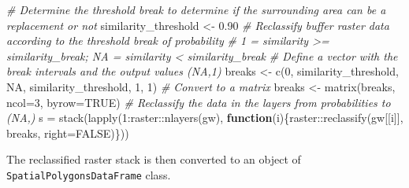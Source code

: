 \documentclass[
  10pt,
  b5paper,
  oneside]{book}
\newenvironment{Shaded}{\begin{snugshade}}{\end{snugshade}}
\newcommand{\AttributeTok}[1]{\textcolor[rgb]{0.77,0.63,0.00}{#1}}
\newcommand{\CommentTok}[1]{\textcolor[rgb]{0.56,0.35,0.01}{\textit{#1}}}
\newcommand{\ConstantTok}[1]{\textcolor[rgb]{0.00,0.00,0.00}{#1}}
\newcommand{\ControlFlowTok}[1]{\textcolor[rgb]{0.13,0.29,0.53}{\textbf{#1}}}
\newcommand{\DecValTok}[1]{\textcolor[rgb]{0.00,0.00,0.81}{#1}}
\newcommand{\DocumentationTok}[1]{\textcolor[rgb]{0.56,0.35,0.01}{\textbf{\textit{#1}}}}
\newcommand{\FloatTok}[1]{\textcolor[rgb]{0.00,0.00,0.81}{#1}}
\newcommand{\FunctionTok}[1]{\textcolor[rgb]{0.00,0.00,0.00}{#1}}
\newcommand{\NormalTok}[1]{#1}
\newcommand{\OtherTok}[1]{\textcolor[rgb]{0.56,0.35,0.01}{#1}}
\newcommand{\SpecialCharTok}[1]{\textcolor[rgb]{0.00,0.00,0.00}{#1}}
\newcommand{\StringTok}[1]{\textcolor[rgb]{0.31,0.60,0.02}{#1}}
\begin{document}
\begin{Shaded}
\begin{Highlighting}[]
  \CommentTok{\# Determine the threshold break to determine if the surrounding area can be a replacement or not}
\NormalTok{    similarity\_threshold }\OtherTok{\textless{}{-}} \FloatTok{0.90}
  \CommentTok{\# Reclassify buffer raster data according to the threshold break of probability}
  \CommentTok{\# 1 = similarity \textgreater{}= similarity\_break; NA =  similarity \textless{}  similarity\_break}
    \CommentTok{\# Define a vector with the break intervals and the output values (NA,1) }
\NormalTok{    breaks }\OtherTok{\textless{}{-}} \FunctionTok{c}\NormalTok{(}\DecValTok{0}\NormalTok{, similarity\_threshold, }\ConstantTok{NA}\NormalTok{, similarity\_threshold, }\DecValTok{1}\NormalTok{, }\DecValTok{1}\NormalTok{)}
    \CommentTok{\# Convert to a matrix}
\NormalTok{    breaks }\OtherTok{\textless{}{-}} \FunctionTok{matrix}\NormalTok{(breaks, }\AttributeTok{ncol=}\DecValTok{3}\NormalTok{, }\AttributeTok{byrow=}\ConstantTok{TRUE}\NormalTok{)}
    \CommentTok{\# Reclassify the data in the layers from probabilities to (NA,)}
\NormalTok{    s }\OtherTok{=} \FunctionTok{stack}\NormalTok{(}\FunctionTok{lapply}\NormalTok{(}\DecValTok{1}\SpecialCharTok{:}\NormalTok{raster}\SpecialCharTok{::}\FunctionTok{nlayers}\NormalTok{(gw), }\ControlFlowTok{function}\NormalTok{(i)\{raster}\SpecialCharTok{::}\FunctionTok{reclassify}\NormalTok{(gw[[i]], breaks, }\AttributeTok{right=}\ConstantTok{FALSE}\NormalTok{)\}))}
\end{Highlighting}
\end{Shaded}

The reclassified raster stack is then converted to an object of \texttt{\textquotesingle{}SpatialPolygonsDataFrame\textquotesingle{}} class.

\begin{Shaded}
\end{Shaded}
\end{document}
